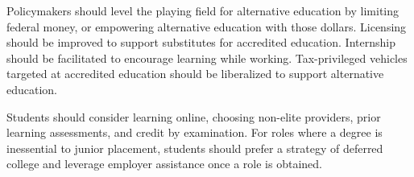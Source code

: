 \documentclass[AER]{./aea-latex-templates/AEA}
\begin{document}
        Policymakers should level the playing field for alternative education by limiting federal money,
        or empowering alternative education with those dollars.
        Licensing should be improved to support substitutes for accredited education.
        Internship should be facilitated to encourage learning while working.
        Tax-privileged vehicles targeted at accredited education should be liberalized
        to support alternative education.

        Students should consider learning online, choosing non-elite providers,
        prior learning assessments, and credit by examination.
        For roles where a degree is inessential to junior placement, students should prefer a strategy of
        deferred college and leverage employer assistance once a role is obtained.
        
        
        
        
        
\end{document}
